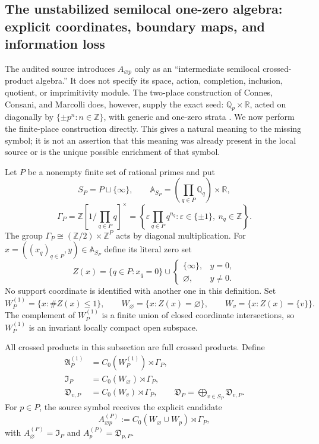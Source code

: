 \subsection{The unstabilized semilocal one-zero algebra: explicit coordinates,
boundary maps, and information loss}
\label{subsec:unstabilized-semilocal-one-zero}

The audited source introduces $A_{\varnothing p}$ only as an
``intermediate semilocal crossed-product algebra.''  It does not specify its
space, action, completion, inclusion, quotient, or imprimitivity module.  The
two-place construction of Connes, Consani, and Marcolli does, however, supply
the exact seed: $\mathbb Q_p\times\mathbb R$, acted on diagonally by
$\{\pm p^n:n\in\mathbb Z\}$, with generic and one-zero strata
\cite[Section~8.2]{connesConsaniMarcolli2007}.  We now perform the finite-place
construction directly.  This gives a natural meaning to the missing symbol;
it is not an assertion that this meaning was already present in the local
source or is the unique possible enrichment of that symbol.

Let $P$ be a nonempty finite set of rational primes and put
\[
 S_P=P\sqcup\{\infty\},\qquad
 \mathbb A_{S_P}=\left(\prod_{q\in P}\mathbb Q_q\right)\times\mathbb R,
\]
\[
 \Gamma_P=\mathbb Z[1/\!\prod_{q\in P}q]^{\times}
 =\left\{\varepsilon\prod_{q\in P}q^{n_q}:
   \varepsilon\in\{\pm1\},\ n_q\in\mathbb Z\right\}.
\]
The group $\Gamma_P\cong(\mathbb Z/2)\times\mathbb Z^P$ acts by diagonal
multiplication.  For $x=((x_q)_{q\in P},y)\in\mathbb A_{S_P}$ define its
literal zero set
\[
 Z(x)=\{q\in P:x_q=0\}\cup
 \begin{cases}\{\infty\},&y=0,\\ \varnothing,&y\ne0.\end{cases}
\]
No support coordinate is identified with another one in this definition.
Set
\[
 W_P^{(1)}=\{x:\#Z(x)\leq1\},\qquad
 W_{\varnothing}=\{x:Z(x)=\varnothing\},\qquad
 W_v=\{x:Z(x)=\{v\}\}.
\]
The complement of $W_P^{(1)}$ is a finite union of closed coordinate
intersections, so $W_P^{(1)}$ is an invariant locally compact open subspace.

\begin{definition}
\label{def:unstabilized-one-zero-algebra}
All crossed products in this subsection are full crossed products.  Define
\begin{align*}
 \mathfrak A_P^{(1)}&=C_0(W_P^{(1)})\rtimes\Gamma_P,\\
 \mathfrak I_P&=C_0(W_{\varnothing})\rtimes\Gamma_P,\\
 \mathfrak D_{v,P}&=C_0(W_v)\rtimes\Gamma_P,\qquad
 \mathfrak D_P=\bigoplus_{v\in S_P}\mathfrak D_{v,P}.
\end{align*}
For $p\in P$, the source symbol receives the explicit candidate
\[
 A_{\varnothing p}^{(P)}
 :=C_0(W_{\varnothing}\cup W_p)\rtimes\Gamma_P,
\]
with $A_{\varnothing}^{(P)}=\mathfrak I_P$ and
$A_p^{(P)}=\mathfrak D_{p,P}$.
\end{definition}

